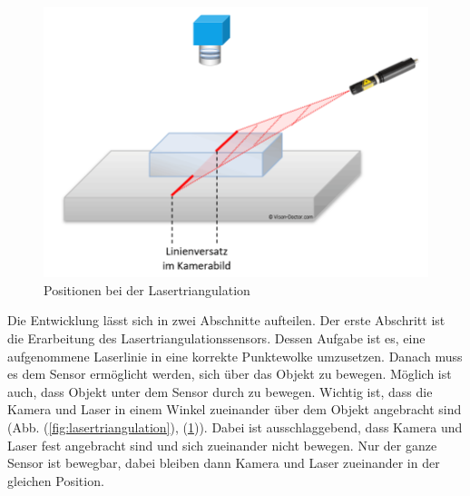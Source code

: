 	\newpage
	
	\begin{figure}[h]
		\centering
		\includegraphics[width=0.6\linewidth]{img/grundlagen/lasertriangulation_2}
		\caption{Positionen bei der Lasertriangulation}
		\label{fig:lasertriangulation_position}
	\end{figure}
	
	Die Entwicklung lässt sich in zwei Abschnitte aufteilen. Der erste Abschritt ist die Erarbeitung des Lasertriangulationssensors. Dessen Aufgabe ist es, eine aufgenommene Laserlinie in eine korrekte Punktewolke umzusetzen. Danach muss es dem Sensor ermöglicht werden, sich über das Objekt zu bewegen. Möglich ist auch, dass Objekt unter dem Sensor durch zu bewegen. \newline
	Wichtig ist, dass die Kamera und Laser in einem Winkel zueinander über dem Objekt angebracht sind (Abb. (\ref{fig:lasertriangulation}), (\ref{fig:lasertriangulation_position})). Dabei ist ausschlaggebend, dass Kamera und Laser fest angebracht sind und sich zueinander nicht bewegen. Nur der ganze Sensor ist bewegbar, dabei bleiben dann Kamera und Laser zueinander in der gleichen Position.
	\label{chap:grundlegender_aufbau}
	
